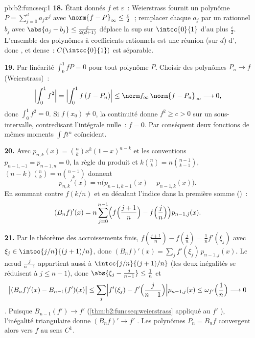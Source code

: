 \begin{solution}{pb:b2:funcseq:1}
\textbf{18.} Étant donnés $f$ et $\varepsilon$~: Weierstrass fournit
un polynôme $P = \sum_{j=0}^d a_jx^j$ avec $\norm{f -
P}_\infty \leq \frac\varepsilon2$~; remplacer chaque $a_j$ par un
rationnel $b_j$ avec $\abs{a_j - b_j} \leq
\frac{\varepsilon}{2(d+1)}$ déplace la  sup sur
$\intcc{0}{1}$ d'au plus $\frac\varepsilon2$. L'ensemble des
polynômes à coefficients rationnels est une réunion  (sur
$d$) d', donc , et dense~:
$C(\intcc{0}{1})$ est séparable.

\textbf{19.} Par linéarité $\int_0^1 fP = 0$ pour tout
polynôme $P$. Choisir des polynômes $P_n \to f$ 
(Weierstrass)~:
\[
\Bigl|\int_0^1 f^2\Bigr|
= \Bigl|\int_0^1 f\,(f - P_n)\Bigr|
\leq \norm f_\infty\,\norm{f - P_n}_\infty
\longrightarrow 0 ,
\]
donc $\int_0^1 f^2 = 0$. Si $f(x_0) \neq 0$, la continuité donne
$f^2 \geq c > 0$ sur un sous-intervalle, contredisant l'intégrale
nulle~: $f = 0$. Par conséquent deux fonctions  de
mêmes moments $\int f t^n$ coïncident.

\textbf{20.} Avec $p_{n,k}(x) = \binom nk x^k(1-x)^{n-k}$ et
les conventions $p_{n-1,-1} = p_{n-1,n} = 0$, la règle du produit
et $k\binom nk = n\binom{n-1}{k-1}$, $(n-k)\binom nk =
n\binom{n-1}{k}$ donnent
\[
p_{n,k}'(x) = n\bigl(p_{n-1,k-1}(x) - p_{n-1,k}(x)\bigr) .
\]
En sommant contre $f(k/n)$ et en décalant l'indice dans la première
somme ()~:
\[
(B_nf)'(x) = n\sum_{j=0}^{n-1}\Bigl(f\Bigl(\frac{j+1}n\Bigr)
- f\Bigl(\frac jn\Bigr)\Bigr)p_{n-1,j}(x) .
\]

\textbf{21.} Par le théorème des accroissements finis, $f(\frac{j+1}n) -
f(\frac jn) = \frac1n f'(\xi_j)$ avec $\xi_j \in
\intoo{j/n}{(j+1)/n}$, donc $(B_nf)'(x) = \sum_j
f'(\xi_j)\,p_{n-1,j}(x)$. Le nœud $\frac{j}{n-1}$ appartient aussi à
$\intcc{j/n}{(j+1)/n}$ (les deux inégalités se réduisent à $j \leq
n-1$), donc $\abs{\xi_j - \frac j{n-1}} \leq \frac1n$ et
\[
\bigl|(B_nf)'(x) - B_{n-1}(f')(x)\bigr|
\leq \sum_j\Bigl|f'(\xi_j) -
f'\Bigl(\frac{j}{n-1}\Bigr)\Bigr| p_{n-1,j}(x)
\leq \omega_{f'}\Bigl(\frac1n\Bigr) \longrightarrow 0
\]
. Puisque $B_{n-1}(f') \to f'$ 
(\cref{thm:b2:funcseq:weierstrass} appliqué au $f'$ ),
l'inégalité triangulaire donne $(B_nf)' \to f'$
. Les polynômes $P_n = B_nf$ convergent alors vers $f$
au sens $C^1$.


\end{solution}
